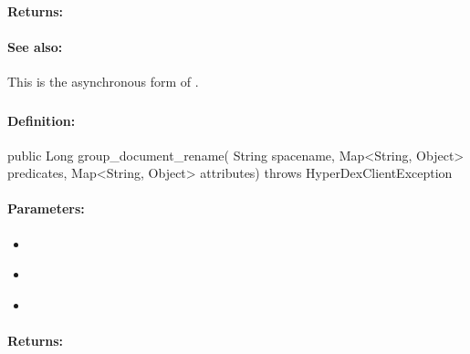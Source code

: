 \paragraph{Returns:}


\paragraph{See also:}  This is the asynchronous form of .

\pagebreak
\subsubsection{}
\label{api:java:group_document_rename}


\paragraph{Definition:}
\begin{javacode}
public Long group_document_rename(
        String spacename,
        Map<String, Object> predicates,
        Map<String, Object> attributes) throws HyperDexClientException
\end{javacode}

\paragraph{Parameters:}
\begin{itemize}[noitemsep]
\item {}\\

\item {}\\

\item {}\\

\end{itemize}

\paragraph{Returns:}


